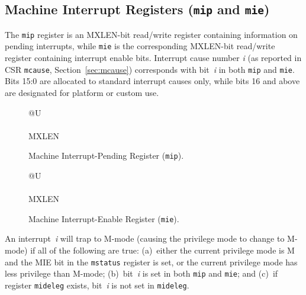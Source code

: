 \subsection{Machine Interrupt Registers ({\tt mip} and {\tt mie})}

The {\tt mip} register is an MXLEN-bit read/write register containing
information on pending interrupts, while {\tt mie} is the
corresponding MXLEN-bit read/write register containing interrupt enable
bits.
Interrupt cause number \textit{i} (as reported in CSR {\tt mcause},
Section~\ref{sec:mcause}) corresponds with bit~\textit{i} in both
{\tt mip} and {\tt mie}.
Bits 15:0 are allocated to standard interrupt causes only, while bits 16
and above are designated for platform or custom use.

\begin{figure}[h!]
{\footnotesize
\begin{center}
\begin{tabular}{@{}U}
 \\
\hline
{} \\
\hline
MXLEN \\
\end{tabular}
\end{center}
}
\vspace{-0.1in}
\caption{Machine Interrupt-Pending Register ({\tt mip}).}
\label{mipreg}
\end{figure}

\begin{figure}[h!]
{\footnotesize
\begin{center}
\begin{tabular}{@{}U}
 \\
\hline
{} \\
\hline
MXLEN \\
\end{tabular}
\end{center}
}
\vspace{-0.1in}
\caption{Machine Interrupt-Enable Register ({\tt mie}).}
\label{miereg}
\end{figure}

An interrupt~\textit{i} will trap to M-mode (causing the privilege mode
to change to M-mode) if all of the following are true:
(a)~either the current privilege mode is M and the MIE bit in the
{\tt mstatus} register is set, or the current privilege mode has less
privilege than M-mode;
(b)~bit~\textit{i} is set in both {\tt mip} and {\tt mie}; and
(c)~if register {\tt mideleg} exists, bit~\textit{i} is not set in
{\tt mideleg}.

